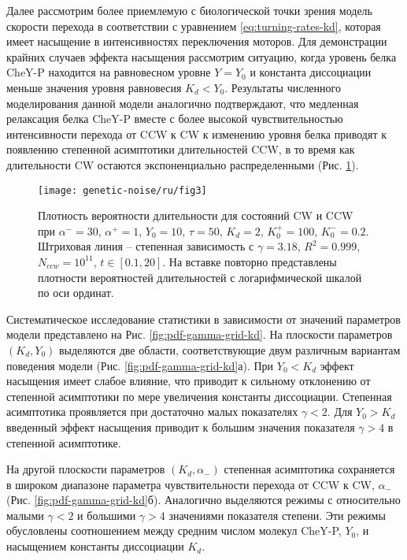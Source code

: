 Далее рассмотрим более приемлемую с биологической точки зрения модель скорости перехода в соответствии с уравнением \cref{eq:turning-rates-kd}, которая имеет насыщение в интенсивностях переключения моторов. Для демонстрации крайних случаев эффекта насыщения рассмотрим ситуацию, когда уровень белка CheY-P находится на равновесном уровне $Y = Y_0$ и константа диссоциации меньше значения уровня равновесия $K_d < Y_0$. Результаты численного моделирования данной модели аналогично подтверждают, что медленная релаксация белка CheY-P вместе с более высокой чувствительностью интенсивности перехода от CCW к CW к изменению уровня белка приводят к появлению степенной асимптотики длительностей CCW, в то время как длительности CW остаются экспоненциально распределенными (Рис. \cref{fig:pdf-kd-powerlaw}).

\begin{figure}[ht]
    \centering
    \texttt{[image: genetic-noise/ru/fig3]}
    \caption{
        Плотность вероятности длительности для состояний CW и CCW при $\alpha^- = 30$, $\alpha^+ = 1$, $Y_0 = 10$, $\tau = 50$, $K_d = 2$, $K^+_0 = 100$, $K^-_0 = 0.2$. Штриховая линия -- степенная зависимость с $\gamma = 3.18$, $R^2 = 0.999$, $N_{ccw} = 10^{11}$, $t \in [0.1, 20]$. На вставке повторно представлены плотности вероятностей длительностей с логарифмической шкалой по оси ординат.
    }
    \label{fig:pdf-kd-powerlaw}
\end{figure}

Систематическое исследование статистики в зависимости от значений параметров модели представлено на Рис. \cref{fig:pdf-gamma-grid-kd}. На плоскости параметров $(K_d, Y_0)$ выделяются две области, соответствующие двум различным вариантам поведения модели (Рис. \cref{fig:pdf-gamma-grid-kd}а). При $Y_0 < K_d$ эффект насыщения имеет слабое влияние, что приводит к сильному отклонению от степенной асимптотики по мере увеличения константы диссоциации. Степенная асимптотика проявляется при достаточно малых показателях $\gamma < 2$. Для $Y_0 > K_d$ введенный эффект насыщения приводит к большим значения показателя $\gamma > 4$ в степенной асимптотике. 

На другой плоскости параметров $(K_d, \alpha_-)$ степенная асимптотика сохраняется в широком диапазоне параметра чувствительности перехода от CCW к CW, $\alpha_-$ (Рис. \cref{fig:pdf-gamma-grid-kd}б). Аналогично выделяются режимы с относительно малыми $\gamma < 2$ и большими $\gamma > 4$ значениями показателя степени. Эти режимы обусловлены соотношением между средним числом молекул CheY-P, $Y_0$, и насыщением константы диссоциации $K_d$.

